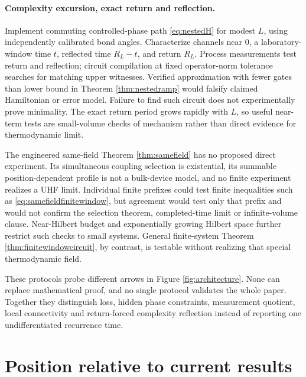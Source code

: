 \paragraph{Complexity excursion, exact return and reflection.}
Implement commuting controlled-phase path \eqref{eq:nestedH} for modest $L$,
using independently calibrated bond angles.  Characterize channels near
$0$, a laboratory-window time $t$, reflected time $R_L-t$, and return
$R_L$.  Process measurements test return and reflection; circuit compilation
at fixed operator-norm tolerance searches for matching upper witnesses.
Verified approximation with fewer gates than lower bound in Theorem
\ref{thm:nestedramp} would falsify claimed Hamiltonian or error model.  Failure
to find such circuit does not experimentally prove minimality.  The exact return
period grows rapidly with $L$, so useful near-term tests are small-volume
checks of mechanism rather than direct evidence for thermodynamic limit.

The engineered same-field Theorem \ref{thm:samefield} has no proposed direct
experiment.  Its simultaneous coupling selection is existential, its
summable position-dependent profile is not a bulk-device model, and no finite
experiment realizes a UHF limit.  Individual finite prefixes could test
finite inequalities such as \eqref{eq:samefieldfinitewindow}, but agreement
would test only that prefix and would not confirm the selection theorem,
completed-time limit or infinite-volume clause.  Near-Hilbert budget and
exponentially growing Hilbert space further restrict such checks to small
systems.  General finite-system Theorem \ref{thm:finitewindowcircuit}, by
contrast, is testable without realizing that special thermodynamic field.

These protocols probe different arrows in Figure \ref{fig:architecture}.
None can replace mathematical proof, and no single protocol validates the whole
paper.  Together they distinguish loss, hidden phase constraints,
measurement quotient, local connectivity and return-forced complexity
reflection instead of reporting one undifferentiated recurrence time.

\section{Position relative to current results}

